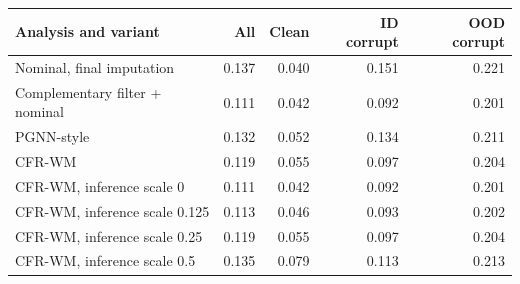 \begin{tabular}{lrrrr}
\toprule
Analysis and variant & All & Clean & ID corrupt & OOD corrupt \\
\midrule
Nominal, final imputation & 0.137 & 0.040 & 0.151 & 0.221 \\
Complementary filter + nominal & 0.111 & 0.042 & 0.092 & 0.201 \\
PGNN-style & 0.132 & 0.052 & 0.134 & 0.211 \\
CFR-WM & 0.119 & 0.055 & 0.097 & 0.204 \\
\midrule
CFR-WM, inference scale 0 & 0.111 & 0.042 & 0.092 & 0.201 \\
CFR-WM, inference scale 0.125 & 0.113 & 0.046 & 0.093 & 0.202 \\
CFR-WM, inference scale 0.25 & 0.119 & 0.055 & 0.097 & 0.204 \\
CFR-WM, inference scale 0.5 & 0.135 & 0.079 & 0.113 & 0.213 \\
\bottomrule
\end{tabular}
